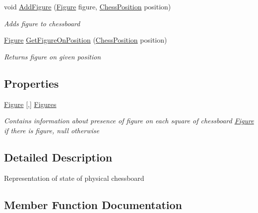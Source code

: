 \begin{DoxyCompactItemize}
void \mbox{\hyperlink{class_chess_tracking_1_1_game_1_1_chessboard_model_a4cce922d242645f63b9fe071dca6e221}{Add\+Figure}} (\mbox{\hyperlink{class_chess_tracking_1_1_game_1_1_figure}{Figure}} figure, \mbox{\hyperlink{class_chess_tracking_1_1_game_1_1_chess_position}{Chess\+Position}} position)
\begin{DoxyCompactList}\small\item\em Adds figure to chessboard \end{DoxyCompactList}\item 
\mbox{\hyperlink{class_chess_tracking_1_1_game_1_1_figure}{Figure}} \mbox{\hyperlink{class_chess_tracking_1_1_game_1_1_chessboard_model_a0a6ca632d187edbe633a18c21d210365}{Get\+Figure\+On\+Position}} (\mbox{\hyperlink{class_chess_tracking_1_1_game_1_1_chess_position}{Chess\+Position}} position)
\begin{DoxyCompactList}\small\item\em Returns figure on given position \end{DoxyCompactList}\end{DoxyCompactItemize}
\subsection*{Properties}
\begin{DoxyCompactItemize}
\item 
\mbox{\hyperlink{class_chess_tracking_1_1_game_1_1_figure}{Figure}} \mbox{[},\mbox{]} \mbox{\hyperlink{class_chess_tracking_1_1_game_1_1_chessboard_model_ac653deeae3dc84b3b0470aac4c60d671}{Figures}}
\begin{DoxyCompactList}\small\item\em Contains information about presence of figure on each square of chessboard \mbox{\hyperlink{class_chess_tracking_1_1_game_1_1_figure}{Figure}} if there is figure, null otherwise \end{DoxyCompactList}\end{DoxyCompactItemize}


\subsection{Detailed Description}
Representation of state of physical chessboard 



\subsection{Member Function Documentation}
\mbox{\label{class_chess_tracking_1_1_game_1_1_chessboard_model_a4cce922d242645f63b9fe071dca6e221}} 
